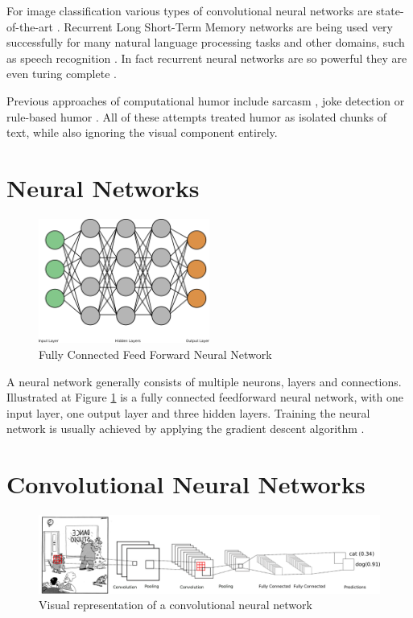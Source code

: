 \documentclass[draft,final,oneside]{vutinfth} %
\begin{document}
For image classification various types of convolutional neural networks are state-of-the-art \cite{dogsvscats}. Recurrent Long Short-Term Memory networks are being used very successfully for many natural language processing tasks and other domains, such as speech recognition \cite{reviewRNN}\cite{googlespeech}. In fact recurrent neural networks are so powerful they are even turing complete \cite{seigelmann:computation}.

Previous approaches of computational humor include sarcasm \cite{Bamman2015ContextualizedSD}, joke detection \cite{Yang2015HumorRA} or rule-based humor \cite{HumoristBot}. All of these attempts treated humor as isolated chunks of text, while also ignoring the visual component entirely.

\section{Neural Networks}
\begin{figure}[ht]
	\centering
  	\includegraphics[width=0.5\textwidth]{graphics/simple_neural_network.png}
	\caption{Fully Connected Feed Forward Neural Network}
	\label{fig:feedforward}
\end{figure}

A neural network generally consists of multiple neurons, layers and connections. Illustrated at Figure \ref{fig:feedforward} is a fully connected feedforward neural network, with one input layer, one output layer and three hidden layers. Training the neural network is usually achieved by applying the gradient descent algorithm \cite{bishop}.

\pagebreak
\section{Convolutional Neural Networks}
\begin{figure}[ht]
	\centering
  	\includegraphics[width=1.0\textwidth]{graphics/cnn.png}
	\caption{Visual representation of a convolutional neural network}
	\label{fig:convolutional}
\end{figure}
\end{document}
